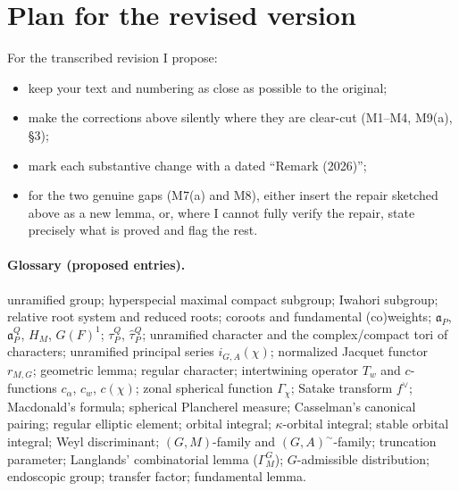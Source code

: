 \documentclass[11pt]{article}
\newcommand{\fa}{\mathfrak{a}}
\begin{document}
\appendix
\section{Plan for the revised version}
For the transcribed revision I propose:
\begin{itemize}
\item keep your text and numbering as close as possible to the original;
\item make the corrections above silently where they are clear-cut (M1--M4, M9(a), \S3);
\item mark each substantive change with a dated ``Remark (2026)'';
\item for the two genuine gaps (M7(a) and M8), either insert the repair sketched above as a new lemma, or, where I cannot fully verify the repair, state precisely what is proved and flag the rest.
\end{itemize}

\paragraph{Glossary (proposed entries).}
unramified group; hyperspecial maximal compact subgroup; Iwahori subgroup; relative root system and reduced roots; coroots and fundamental (co)weights; $\fa_P$, $\fa_P^Q$, $H_M$, $G(F)^1$; $\tau_P^Q$, $\hat\tau_P^Q$; unramified character and the complex/compact tori of characters; unramified principal series $i_{G,A}(\chi)$; normalized Jacquet functor $r_{M,G}$; geometric lemma; regular character; intertwining operator $T_w$ and $c$-functions $c_\alpha$, $c_w$, $c(\chi)$; zonal spherical function $\Gamma_\chi$; Satake transform $f^\vee$; Macdonald's formula; spherical Plancherel measure; Casselman's canonical pairing; regular elliptic element; orbital integral; $\kappa$-orbital integral; stable orbital integral; Weyl discriminant; $(G,M)$-family and $(G,A)^\sim$-family; truncation parameter; Langlands' combinatorial lemma ($\Gamma_M^G$); $G$-admissible distribution; endoscopic group; transfer factor; fundamental lemma.
\end{document}
